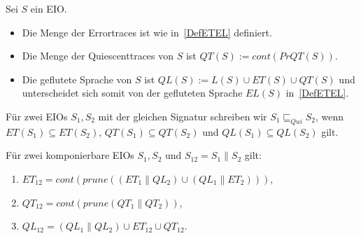 \begin{Def}
  \label{DefQTQL}
  Sei $S$ ein EIO.
  \begin{itemize}
    \item Die Menge der Errortraces ist wie in~\ref{DefETEL} definiert.
    \item Die Menge der Quiescenttraces von $S$ ist $QT(S) := cont(PrQT(S))$.
    \item Die geflutete Sprache von $S$ ist $QL(S):=L(S)\cup ET(S)\cup QT(S)$
      und unterscheidet sich somit von der gefluteten Sprache $EL(S)$
      in~\ref{DefETEL}.
  \end{itemize}
  Für zwei EIOs $S_1, S_2$ mit der gleichen Signatur schreiben wir
  $S_1\sqsubseteq _{Qui} S_2$, wenn $ET(S_1)\subseteq ET(S_2)$,
  $QT(S_1)\subseteq QT(S_2)$ und $QL(S_1)\subseteq QL(S_2)$ gilt.
\end{Def}

\begin{satz}
  \label{satzQuiSemantik}
  Für zwei komponierbare EIOs $S_1, S_2$ und $S_{12} = S_1\|S_2$ gilt:
  \begin{enumerate}
    \item $ET_{12} = cont(prune((ET_1\|QL_2)\cup (QL_1\|ET_2)))$,
    \item $QT_{12} = cont(prune(QT_1\|QT_2))$,%
    \item $QL_{12} = (QL_1\|QL_2)\cup ET_{12}\cup QT_{12}$.%
  \end{enumerate}
\end{satz}

